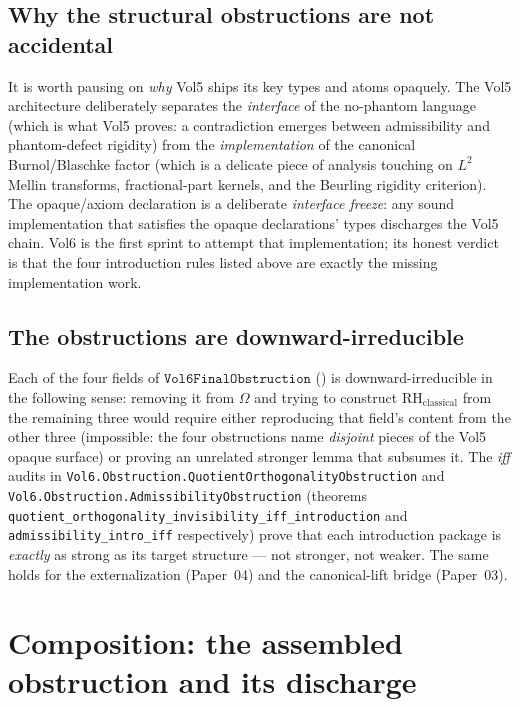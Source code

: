 \documentclass[11pt]{article}
\theoremstyle{plain}
\theoremstyle{definition}
\theoremstyle{remark}
\newcommand{\code}[1]{\texttt{#1}}
\newcommand{\RH}{\mathrm{RH}_{\mathrm{classical}}}
\newcommand{\Obs}{\Omega}
\begin{document}
\subsection{Why the structural obstructions are not accidental}

It is worth pausing on \emph{why} Vol5 ships its key types and atoms
opaquely.  The Vol5 architecture deliberately separates the
\emph{interface} of the no-phantom language (which is what Vol5
proves: a contradiction emerges between admissibility and
phantom-defect rigidity) from the \emph{implementation} of the
canonical Burnol/Blaschke factor (which is a delicate piece of
analysis touching on \(L^{2}\) Mellin transforms, fractional-part
kernels, and the Beurling rigidity criterion).  The opaque/axiom
declaration is a deliberate \emph{interface freeze}: any sound
implementation that satisfies the opaque declarations' types
discharges the Vol5 chain.  Vol6 is the first sprint to attempt
that implementation; its honest verdict is that the four
introduction rules listed above are exactly the missing
implementation work.

\subsection{The obstructions are downward-irreducible}

Each of the four fields of \(\code{Vol6FinalObstruction}\)
() is downward-irreducible in the
following sense: removing it from \(\Obs\) and trying to construct
\(\RH\) from the remaining three would require either reproducing
that field's content from the other three (impossible: the four
obstructions name \emph{disjoint} pieces of the Vol5 opaque
surface) or proving an unrelated stronger lemma that subsumes it.
The \emph{iff} audits in
\code{Vol6.Obstruction.QuotientOrthogonalityObstruction} and
\code{Vol6.Obstruction.AdmissibilityObstruction}
(theorems
\code{quotient\_orthogonality\_invisibility\_iff\_introduction} and
\code{admissibility\_intro\_iff} respectively) prove that each
introduction package is \emph{exactly} as strong as its target
structure --- not stronger, not weaker.  The same holds for the
externalization (Paper~04) and the canonical-lift bridge
(Paper~03).

\section{Composition: the assembled obstruction and its discharge}
\label{sec:composition}
\end{document}
